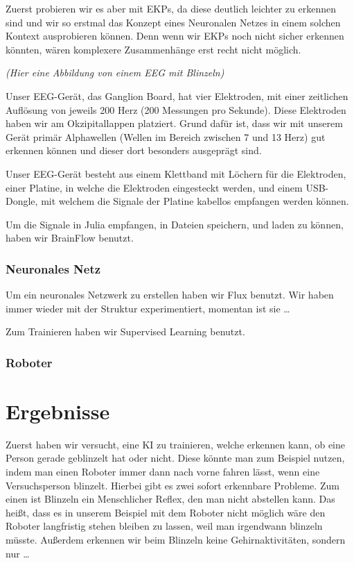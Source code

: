 \documentclass{scrartcl}
\begin{document}
	Zuerst probieren wir es aber mit EKPs, da diese deutlich leichter zu erkennen sind und wir so erstmal das Konzept eines Neuronalen Netzes in einem solchen Kontext ausprobieren können. Denn wenn wir EKPs noch nicht sicher erkennen könnten, wären komplexere Zusammenhänge erst recht nicht möglich.
	 
	\textit{(Hier eine Abbildung von einem EEG mit Blinzeln) }
	
	Unser EEG-Gerät, das Ganglion Board, hat vier Elektroden, mit einer zeitlichen Auflösung von jeweils 200 Herz (200 Messungen pro Sekunde). Diese Elektroden haben wir am Okzipitallappen platziert. Grund dafür ist, dass wir mit unserem Gerät primär Alphawellen (Wellen im Bereich zwischen 7 und 13 Herz) gut erkennen können und dieser dort besonders ausgeprägt sind.
	
	Unser EEG-Gerät besteht aus einem Klettband mit Löchern für die Elektroden, einer Platine, in welche die Elektroden eingesteckt werden, und einem USB-Dongle, mit welchem die Signale der Platine kabellos empfangen werden können.
	
	Um die Signale in Julia empfangen, in Dateien speichern, und laden zu können, haben wir BrainFlow benutzt.

	\subsubsection{Neuronales Netz}

	Um ein neuronales Netzwerk zu erstellen haben wir Flux benutzt. Wir haben immer wieder mit der Struktur experimentiert, momentan ist sie … 

	Zum Trainieren haben wir Supervised Learning benutzt.

	\subsubsection{Roboter}

	\section{Ergebnisse}

	Zuerst haben wir versucht, eine KI zu trainieren, welche erkennen kann, ob eine Person gerade geblinzelt hat oder nicht. Diese könnte man zum Beispiel nutzen, indem man einen Roboter immer dann nach vorne fahren lässt, wenn eine Versuchsperson blinzelt. Hierbei gibt es zwei sofort erkennbare Probleme. Zum einen ist Blinzeln ein Menschlicher Reflex, den man nicht abstellen kann. Das heißt, dass es in unserem Beispiel mit dem Roboter nicht möglich wäre den Roboter langfristig stehen bleiben zu lassen, weil man irgendwann blinzeln müsste. Außerdem erkennen wir beim Blinzeln keine Gehirnaktivitäten, sondern nur … 
\end{document}
